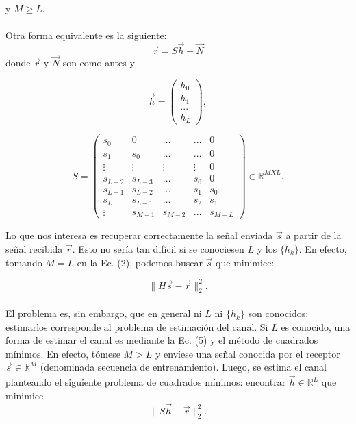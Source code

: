 \documentclass[10pt,journal,compsoc]{IEEEtran}
\begin{document}
y $M \geq L$. \\ \\
Otra forma equivalente es la siguiente:
\begin{equation}
\vec{r} = S\vec{h}+\vec{N}
\end{equation}
donde $\vec{r}$ y $\vec{N}$ son como antes y

\begin{equation}
\vec{h} = \left(
\begin{array}{c}
h_0\\ h_1\\ ...\\h_L
\end{array}
\right),
\end{equation}

\begin{equation}
S = \left(
\begin{array}{ccccccccc}
s_{0} & 0 & \ldots & \ldots & 0\\ 
s_{1} & s_{0} &\ldots & \ldots & 0\\
\vdots & \vdots & \vdots & \vdots &0\\
s_{L-2} &s_{L-3} &\ldots & s_{0} &0 \\
s_{L-1} &s_{L-2} &\ldots & s_{1} & s_{0} \\
s_{L} & s_{L-1} & \ldots &  s_{2} & s_{1}  \\
\vdots & s_{M-1}& s_{M-2} & \ldots & s_{M-L}
\end{array}
\right) \in \mathbb{R}^{M X L}.
\end{equation}

Lo que nos interesa es recuperar correctamente la se\~nal enviada $\vec{s}$ a partir de la se\~nal recibida $\vec{r}$. Esto no ser\'ia tan dif\'icil si se conociesen $L$ y los $\{{h_{k}\}}$. En
efecto, tomando $M = L$ en la Ec. (2), podemos buscar $\vec{s}$ que minimice:

\begin{equation}
\| H\vec{s}-\vec{r}\|_{2}^{2}  .
\end{equation}
\\

El problema es, sin embargo, que en general ni $L$ ni $\{{h_{k}\}}$ son conocidos: estimarlos
corresponde al problema de estimaci\'on del canal.
Si $L$ es conocido, una forma de estimar el canal es mediante la Ec. (5) y el
m\'etodo de cuadrados m\'inimos. En efecto, t\'omese $M > L$ y env\'iese una se\~nal
conocida por el receptor $\vec{s} \in \mathbb{R}^{M} $ (denominada secuencia de entrenamiento).
Luego, se estima el canal planteando el siguiente problema de cuadrados m\'inimos:
encontrar $\vec{h} \in \mathbb{R}^{L} $ que minimice
\begin{equation}
\| S\vec{h}-\vec{r}\|_{2}^{2}  .
\end{equation}
\end{document}
